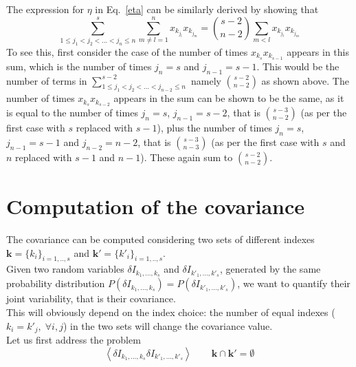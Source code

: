 \documentclass[11pt,letterpaper]{article}
\begin{document}
The expression for $\eta$ in Eq.~\eqref{eta} can be similarly derived by showing that 
\begin{equation*}
    \sum_{1\leq j_{1}<j_{2}<...<j_{n}\leq n}^{s} \sum_{m\neq l=1}^{n}x_{k_{j_{l}}} x_{k_{j_{m}}} = \binom{s-2}{n-2} \sum_{m<l} x_{k_{j_{l}}} x_{k_{j_{m}}}
    \label{eq:proof2}
\end{equation*}
To see this, first consider the case of the number of times $x_{k_{s}}x_{k_{s-1}}$ appears in this sum, which is the number of times $j_n=s$ and $j_{n-1}=s-1$. This would be the number of terms in  $\sum_{1\leq j_{1}<j_{2}<...<j_{n-2}\leq n}^{s-2}$ namely $\binom{s-2}{n-2}$ as shown above. The number of times $x_{k_{s}}x_{k_{s-2}}$ appears in the sum can be shown to be the same, as it is equal to the number of times $j_n=s$, $j_{n-1}=s-2$, that is $\binom{s-3}{n-2}$ (as per the first case with $s$ replaced with $s-1$), plus the number of times $j_n=s$, $j_{n-1}=s-1$ and $j_{n-2}=n-2$, that is $\binom{s-3}{n-3}$ (as per the first case with $s$ and $n$ replaced with $s-1$ and $n-1$). These again sum to $\binom{s-2}{n-2}$. 

\section*{Computation of the covariance}
\label{appC}

The covariance can be computed considering two sets of different indexes $\bm{k}=\{ k_{i} \}_{i=1,..,s}$ and $\bm{k}'=\{ k'_{i} \}_{i=1,..,s}$.\\
Given two random variables $\delta I_{k_{1},...,k_{s}}$ and $\delta I_{k'_{1},...,k'_{s}}$, generated by the same probability distribution $P(\delta I_{k_{1},...,k_{s}}) = P(\delta I_{k'_{1},...,k'_{s}})$, we want to quantify their joint variability, that is their covariance. \\
This will obviously depend on the index choice: the number of equal indexes ($k_{i}=k'_{j}, \; \forall i,j$) in the two sets will change the covariance value.\\
Let us first address the problem
\begin{equation}
    \left\langle \delta I_{k_{1},...,k_{s}} \delta I_{k'_{1},...,k'_{s}} \right\rangle \qquad \bm{k} \cap  \bm{k}'= \emptyset
    \label{disjoint}
\end{equation}
\end{document}
